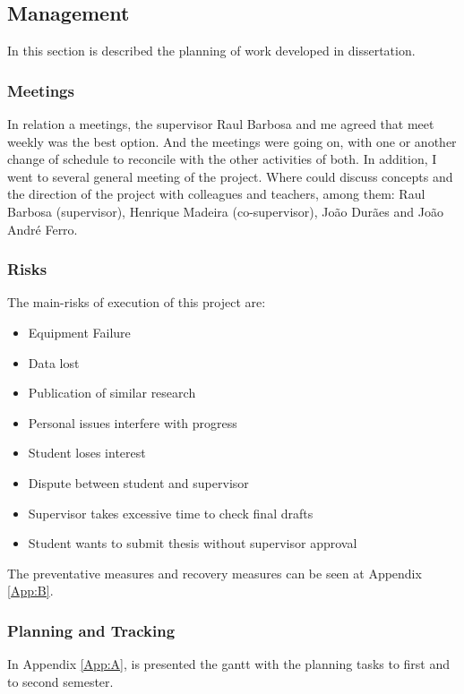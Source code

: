 \newpage
\subsection{Management}

In this section is described the planning of work developed in dissertation.

\subsubsection{Meetings}
In relation a meetings, the supervisor Raul Barbosa and me agreed that meet weekly was the best option. And the meetings were going on, with one or another change of schedule to reconcile with the other activities of both. In addition, I went to several general meeting of the project. Where could discuss concepts and the direction of the project with colleagues and teachers, among them: Raul Barbosa (supervisor), Henrique Madeira (co-supervisor), João Durães and João André Ferro.

\subsubsection{Risks}

The main-risks of execution of this project are:

\begin{itemize}
	\item Equipment Failure
	\item Data lost
	\item Publication of similar research
	\item Personal issues interfere with progress
	\item Student loses interest
	\item Dispute between student and supervisor
	\item Supervisor takes excessive time to check final drafts
	\item Student wants to submit thesis without supervisor approval
\end{itemize}


The preventative measures and recovery measures can be seen at Appendix \ref{App:B}.

\subsubsection{Planning and Tracking}
In Appendix \ref{App:A}, is presented the gantt with the planning tasks to first and to second semester.

